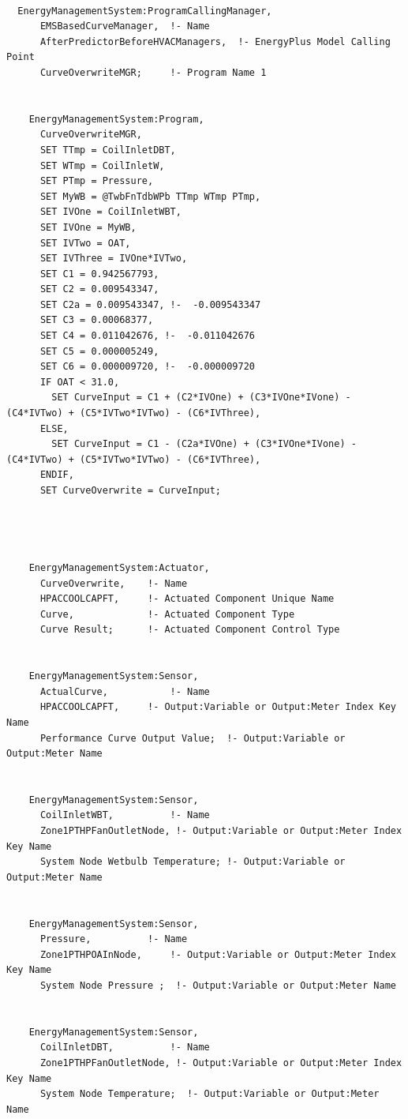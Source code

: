 \begin{lstlisting}

  EnergyManagementSystem:ProgramCallingManager,
      EMSBasedCurveManager,  !- Name
      AfterPredictorBeforeHVACManagers,  !- EnergyPlus Model Calling Point
      CurveOverwriteMGR;     !- Program Name 1


    EnergyManagementSystem:Program,
      CurveOverwriteMGR,
      SET TTmp = CoilInletDBT,
      SET WTmp = CoilInletW,
      SET PTmp = Pressure,
      SET MyWB = @TwbFnTdbWPb TTmp WTmp PTmp,
      SET IVOne = CoilInletWBT,
      SET IVOne = MyWB,
      SET IVTwo = OAT,
      SET IVThree = IVOne*IVTwo,
      SET C1 = 0.942567793,
      SET C2 = 0.009543347,
      SET C2a = 0.009543347, !-  -0.009543347
      SET C3 = 0.00068377,
      SET C4 = 0.011042676, !-  -0.011042676
      SET C5 = 0.000005249,
      SET C6 = 0.000009720, !-  -0.000009720
      IF OAT < 31.0,
        SET CurveInput = C1 + (C2*IVOne) + (C3*IVOne*IVone) - (C4*IVTwo) + (C5*IVTwo*IVTwo) - (C6*IVThree),
      ELSE,
        SET CurveInput = C1 - (C2a*IVOne) + (C3*IVOne*IVone) - (C4*IVTwo) + (C5*IVTwo*IVTwo) - (C6*IVThree),
      ENDIF,
      SET CurveOverwrite = CurveInput;




    EnergyManagementSystem:Actuator,
      CurveOverwrite,    !- Name
      HPACCOOLCAPFT,     !- Actuated Component Unique Name
      Curve,             !- Actuated Component Type
      Curve Result;      !- Actuated Component Control Type


    EnergyManagementSystem:Sensor,
      ActualCurve,           !- Name
      HPACCOOLCAPFT,     !- Output:Variable or Output:Meter Index Key Name
      Performance Curve Output Value;  !- Output:Variable or Output:Meter Name


    EnergyManagementSystem:Sensor,
      CoilInletWBT,          !- Name
      Zone1PTHPFanOutletNode, !- Output:Variable or Output:Meter Index Key Name
      System Node Wetbulb Temperature; !- Output:Variable or Output:Meter Name


    EnergyManagementSystem:Sensor,
      Pressure,          !- Name
      Zone1PTHPOAInNode,     !- Output:Variable or Output:Meter Index Key Name
      System Node Pressure ;  !- Output:Variable or Output:Meter Name


    EnergyManagementSystem:Sensor,
      CoilInletDBT,          !- Name
      Zone1PTHPFanOutletNode, !- Output:Variable or Output:Meter Index Key Name
      System Node Temperature;  !- Output:Variable or Output:Meter Name



\end{lstlisting}
